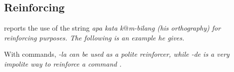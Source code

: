 \subsection{Reinforcing}\label{sec:pragm:Reinforcing}
\citet{Slomanson2008ismil} reports the use of the string \em apa kata k$@$m-bilang \em (his orthography) for reinforcing purposes. The following is an example he gives.




With commands, \em -la \em {} can be used as a polite reinforcer, while \em -de \em is a very impolite way to reinforce a command .

% 




